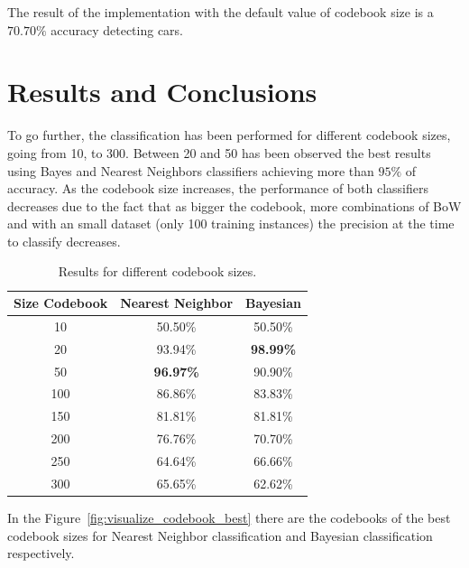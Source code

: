 \documentclass{ethz_report}
\begin{document}
The result of the implementation with the default value of codebook size is a $70.70\%$ accuracy detecting cars.

\section*{Results and Conclusions}

To go further, the classification has been performed for different codebook sizes, going from 10, to 300. Between 20 and 50 has been observed the best results using Bayes and Nearest Neighbors classifiers achieving more than $95\%$ of accuracy. As the codebook size increases, the performance of both classifiers decreases due to the fact that as bigger the codebook, more combinations of BoW and with an small dataset (only 100 training instances) the precision at the time to classify decreases.

\begin{table}
    \centering
    \begin{tabular}{ | c | c | c | }
        \hline
        \textbf{Size Codebook} & \textbf{Nearest Neighbor} & \textbf{Bayesian} \\
        \hline \hline
        10 & 50.50\% & 50.50\% \\
        20 & 93.94\% & \textbf{98.99\%} \\
        50 & \textbf{96.97\%} & 90.90\% \\
        100 & 86.86\% & 83.83\% \\
        150 & 81.81\% & 81.81\% \\
        200 & 76.76\% & 70.70\% \\
        250 & 64.64\% & 66.66\% \\
        300 & 65.65\% & 62.62\% \\
        \hline
    \end{tabular}
    \caption{Results for different codebook sizes.}
    \label{tab:results}
\end{table}

In the Figure~\ref{fig:visualize_codebook_best} there are the codebooks of the best codebook sizes for Nearest Neighbor classification and Bayesian classification respectively.
\end{document}
